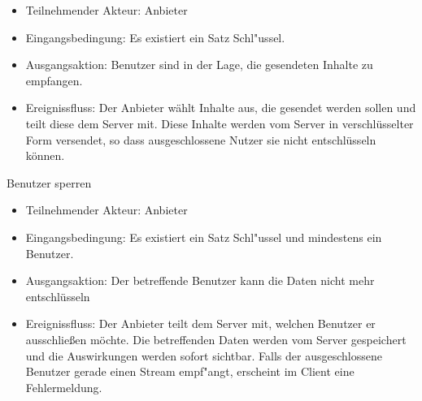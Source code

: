 \documentclass[a4paper,10pt]{scrartcl}
\begin{document}
\begin{usecase}
{\begin{itemize}
   \item Teilnehmender Akteur: Anbieter
   \item Eingangsbedingung: Es existiert ein Satz Schl"ussel.
   \item Ausgangsaktion: Benutzer sind in der Lage, die gesendeten Inhalte zu empfangen.
   \item Ereignissfluss: Der Anbieter wählt Inhalte aus, die gesendet werden sollen und
         teilt diese dem Server mit. Diese Inhalte werden vom Server in verschlüsselter Form
         versendet, so dass ausgeschlossene Nutzer sie nicht entschlüsseln können.
   \end{itemize}
}
 {Benutzer sperren
   \begin{itemize}
   \item Teilnehmender Akteur: Anbieter
   \item Eingangsbedingung: Es existiert ein Satz Schl"ussel und mindestens ein Benutzer.
   \item Ausgangsaktion: Der betreffende Benutzer kann die Daten nicht mehr entschlüsseln
   \item Ereignissfluss: Der Anbieter teilt dem Server mit, welchen Benutzer er ausschließen möchte.
         Die betreffenden Daten werden vom Server gespeichert und die Auswirkungen werden
         sofort sichtbar. Falls der ausgeschlossene Benutzer gerade einen Stream empf"angt,
         erscheint im Client eine Fehlermeldung.
   \end{itemize}
}
\end{usecase}
\clearpage
\end{document}
